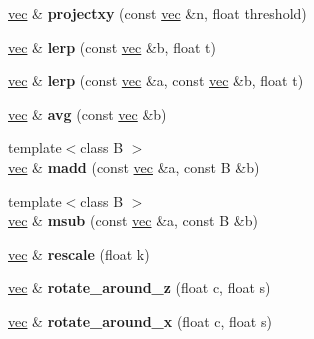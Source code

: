 \begin{DoxyCompactItemize}
\mbox{\label{structvec_a7dc2a80a49955099e9b2e1663e21f7d8}} 
\hyperlink{structvec}{vec} \& {\bfseries projectxy} (const \hyperlink{structvec}{vec} \&n, float threshold)
\item 
\mbox{\label{structvec_a2dfea93f31cabf2e75618d59e4851008}} 
\hyperlink{structvec}{vec} \& {\bfseries lerp} (const \hyperlink{structvec}{vec} \&b, float t)
\item 
\mbox{\label{structvec_a25ce5e88c82f0a2a1ec5f7d243a79718}} 
\hyperlink{structvec}{vec} \& {\bfseries lerp} (const \hyperlink{structvec}{vec} \&a, const \hyperlink{structvec}{vec} \&b, float t)
\item 
\mbox{\label{structvec_a7d94fa97ba157c5a9eb552e0b65ab8a4}} 
\hyperlink{structvec}{vec} \& {\bfseries avg} (const \hyperlink{structvec}{vec} \&b)
\item 
\mbox{\label{structvec_a911359ce08431a1193bcbb1730aafd5e}} 
{\footnotesize template$<$class B $>$ }\\\hyperlink{structvec}{vec} \& {\bfseries madd} (const \hyperlink{structvec}{vec} \&a, const B \&b)
\item 
\mbox{\label{structvec_a0875db6275a1f0ed082db73fb4ed5be5}} 
{\footnotesize template$<$class B $>$ }\\\hyperlink{structvec}{vec} \& {\bfseries msub} (const \hyperlink{structvec}{vec} \&a, const B \&b)
\item 
\mbox{\label{structvec_a5f0d5886757088d04104df85afb8ebb0}} 
\hyperlink{structvec}{vec} \& {\bfseries rescale} (float k)
\item 
\mbox{\label{structvec_ad9e740d902ce03dee5b7e9501eb47bbe}} 
\hyperlink{structvec}{vec} \& {\bfseries rotate\+\_\+around\+\_\+z} (float c, float s)
\item 
\mbox{\label{structvec_aeb9dc5458221e813418dc5f6555daa62}} 
\hyperlink{structvec}{vec} \& {\bfseries rotate\+\_\+around\+\_\+x} (float c, float s)
\item 
\mbox{\label{structvec_ab89415d849cc12e2d020c83e5d7f6ed5}} 

\end{DoxyCompactItemize}
